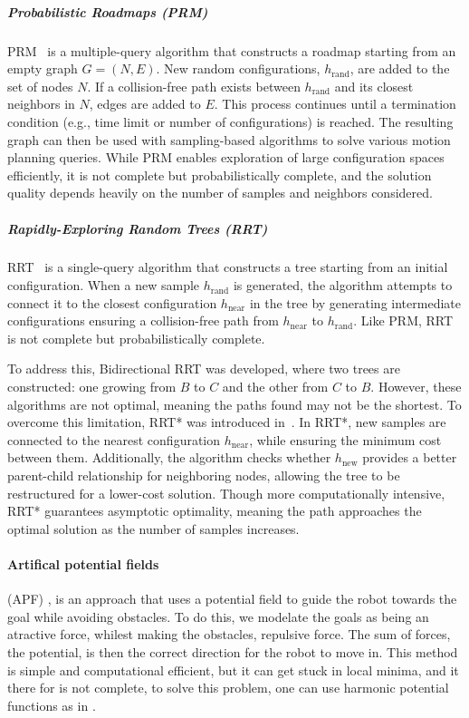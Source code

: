 \subparagraph{Probabilistic Roadmaps (PRM)} 

PRM~\cite{PRM508439} is a multiple-query algorithm that constructs a roadmap starting from an empty graph $G = (N, E)$. New random configurations, $h_{\text{rand}}$, are added to the set of nodes $N$. If a collision-free path exists between $h_{\text{rand}}$ and its closest neighbors in $N$, edges are added to $E$. This process continues until a termination condition (e.g., time limit or number of configurations) is reached. The resulting graph can then be used with sampling-based algorithms to solve various motion planning queries. While PRM enables exploration of large configuration spaces efficiently, it is not complete but probabilistically complete, and the solution quality depends heavily on the number of samples and neighbors considered.

\subparagraph{Rapidly-Exploring Random Trees (RRT)} 

RRT~\cite{lavalle2006planning} is a single-query algorithm that constructs a tree starting from an initial configuration. When a new sample $h_{\text{rand}}$ is generated, the algorithm attempts to connect it to the closest configuration $h_{\text{near}}$ in the tree by generating intermediate configurations ensuring a collision-free path from $h_{\text{near}}$ to $h_{\text{rand}}$. Like PRM, RRT is not complete but probabilistically complete. 

To address this, Bidirectional RRT was developed, where two trees are constructed: one growing from $B$ to $C$ and the other from $C$ to $B$. However, these algorithms are not optimal, meaning the paths found may not be the shortest. To overcome this limitation, RRT* was introduced in~\cite{karaman2011sampling}. In RRT*, new samples are connected to the nearest configuration $h_{\text{near}}$, while ensuring the minimum cost between them. Additionally, the algorithm checks whether $h_{\text{new}}$ provides a better parent-child relationship for neighboring nodes, allowing the tree to be restructured for a lower-cost solution. Though more computationally intensive, RRT* guarantees asymptotic optimality, meaning the path approaches the optimal solution as the number of samples increases.

\paragraph{Artifical potential fields} (APF) \cite{khatib1985real}, is an approach that uses a potential field to guide the robot towards the goal while avoiding obstacles. To do this, we modelate the goals as being an atractive force, whilest making the obstacles, repulsive force. The sum of forces, the potential, is then the correct direction for the robot to move in. This method is simple and computational efficient, but it can get stuck in local minima, and it there for is not complete, to solve this problem, one can use harmonic potential functions as in \cite{kim1992real,rimon1990exact}.




